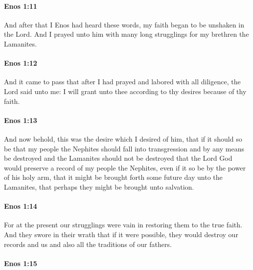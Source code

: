 		\paragraph{Enos 1:11} %
			\label{ENOS-1-11}

			And after that I Enos had heard these words,
			my faith began to be unshaken in the Lord.
			And I prayed unto him with many long strugglings
			for my brethren the Lamanites.

		\paragraph{Enos 1:12} %
			\label{ENOS-1-12}

			And it came to pass that
			after I had prayed and labored with all diligence,
			the Lord said unto me:
			I will grant unto thee according to thy desires because of thy faith.

		\paragraph{Enos 1:13} %
			\label{ENOS-1-13}

			And now behold, this was the desire which I desired of him,
			that if it should so be that my people the Nephites should fall into transgression
			and by any means be destroyed and the Lamanites should not be destroyed
			that the Lord God would preserve a record of my people the Nephites,
			even if it so be by the power of his holy arm,
			that it might be brought forth some future day unto the Lamanites,
			that perhaps they might be brought unto salvation.

		\paragraph{Enos 1:14} %
			\label{ENOS-1-14}

			For at the present our strugglings were vain
			in restoring them to the true faith.
			And they swore in their wrath
			that if it were possible,
			they would destroy our records and us
			and also all the traditions of our fathers.

		\paragraph{Enos 1:15} %
			\label{ENOS-1-15}

